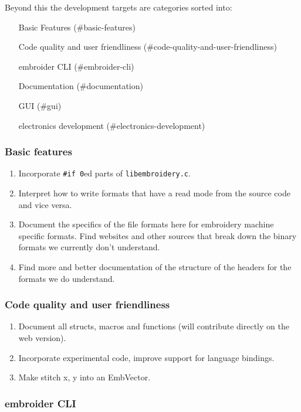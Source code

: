 \documentclass[a4paper, 11pt]{report}
\begin{document}
Beyond this the development targets are categories sorted into:

\begin{enumerate}
\item [Basic Features](\#basic-features)
\item [Code quality and user friendliness](\#code-quality-and-user-friendliness)
\item [embroider CLI](\#embroider-cli)
\item [Documentation](\#documentation)
\item [GUI](\#gui)
\item [electronics development](\#electronics-development)
\end{enumerate}

\subsubsection{Basic features}

\begin{enumerate}
\item Incorporate \texttt{\#if 0}ed parts of \texttt{libembroidery.c}.
\item Interpret how to write formats that have a read mode from the source code and vice versa.
\item Document the specifics of the file formats here for embroidery machine specific formats. Find websites and other sources that break down the binary formats we currently don't understand.
\item Find more and better documentation of the structure of the headers for the formats we do understand.
\end{enumerate}

\subsubsection{Code quality and user friendliness}

\begin{enumerate}
\item Document all structs, macros and functions (will contribute directly
   on the web version).
\item Incorporate experimental code, improve support for language bindings.
\item Make stitch x, y into an EmbVector.
\end{enumerate}

\subsubsection{embroider CLI}
\end{document}
